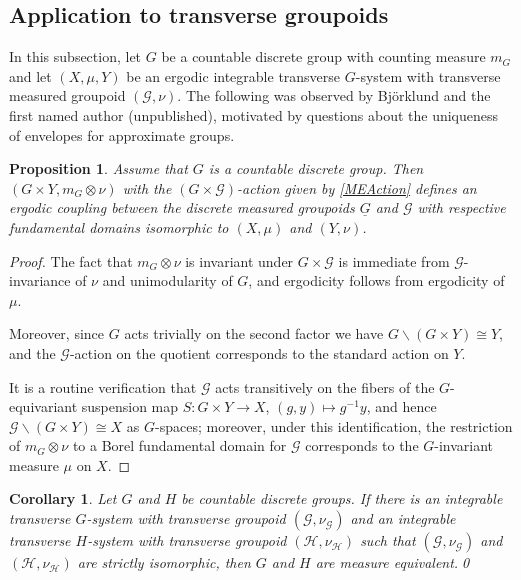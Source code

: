 \documentclass[11pt, oneside]{amsart}
\newtheorem{prop}[lemma]{Proposition}
\newtheorem{cor}[lemma]{Corollary}
\theoremstyle{definition}
\theoremstyle{remark}
\theoremstyle{TheoremNum}
\newcommand{\cG}{\mathcal{G}}
\newcommand{\cH}{\mathcal{H}}
\begin{document}
\subsection{Application to transverse groupoids}\label{sec:4.3}
In this subsection, let $G$ be a countable discrete group with counting measure $m_G$ and let $(X, \mu, Y)$ be an ergodic integrable transverse $G$-system with transverse measured groupoid $(\cG, \nu)$. The following was observed by Bj\"orklund and the first named author (unpublished), motivated by questions about the uniqueness of envelopes for approximate groups.
\begin{prop}\label{METrans} Assume that $G$ is a countable discrete group. Then $(G \times Y, m_G \otimes \nu)$ with the $(G \times \cG)$-action given by \eqref{MEAction} defines an ergodic coupling between
the discrete measured groupoids $\underline{G}$ and $\cG$ with respective fundamental domains isomorphic to $(X, \mu)$ and $(Y, \nu)$.
\end{prop}
\begin{proof} The fact that $m_G \otimes \nu$ is invariant under  $G \times \cG$ is immediate from $\cG$-invariance of $\nu$ and unimodularity of $G$, and ergodicity follows from ergodicity of $\mu$.

 Moreover, since $G$ acts trivially on the second factor we have $G \backslash (G \times Y) \cong Y$, and the $\cG$-action on the quotient corresponds to the standard action on $Y$. 
 
It is a routine verification that $\cG$ acts transitively on the fibers of the $G$-equivariant suspension map $S: G \times Y \to X$, $(g,y) \mapsto g^{-1}y$, and hence $\cG \backslash (G \times Y) \cong X$ as $G$-spaces; moreover, under this identification, the restriction of $m_G \otimes \nu$ to a Borel fundamental domain for $\cG$ corresponds to the $G$-invariant measure $\mu$ on $X$. 
\end{proof}
\begin{cor}\label{MERig} Let $G$ and $H$ be countable discrete groups. If there is an integrable transverse $G$-system with transverse groupoid $(\cG, \nu_{\cG})$ and an integrable transverse $H$-system with transverse groupoid $(\cH, \nu_{\cH})$ such that  $(\cG, \nu_{\cG})$ and  $(\cH, \nu_{\cH})$ are strictly isomorphic, then $G$ and $H$ are measure equivalent.\qed
\end{cor}
\end{document}
